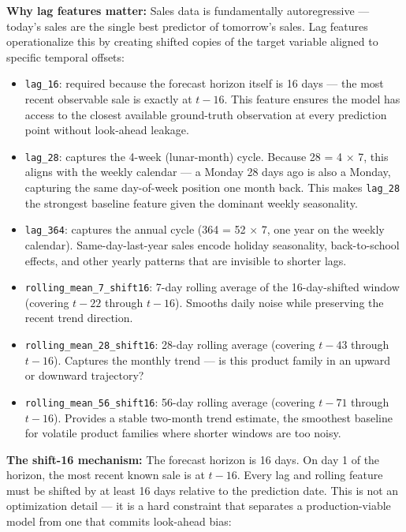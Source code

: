 \textbf{Why lag features matter:} Sales data is fundamentally autoregressive — today's sales are the single best predictor of tomorrow's sales. Lag features operationalize this by creating shifted copies of the target variable aligned to specific temporal offsets:
\begin{itemize}
  \item \texttt{lag\_16}: required because the forecast horizon itself is 16 days — the most recent observable sale is exactly at $t-16$. This feature ensures the model has access to the closest available ground-truth observation at every prediction point without look-ahead leakage.
  \item \texttt{lag\_28}: captures the 4-week (lunar-month) cycle. Because 28 = 4 $\times$ 7, this aligns with the weekly calendar — a Monday 28 days ago is also a Monday, capturing the same day-of-week position one month back. This makes \texttt{lag\_28} the strongest baseline feature given the dominant weekly seasonality.
  \item \texttt{lag\_364}: captures the annual cycle (364 = 52 $\times$ 7, one year on the weekly calendar). Same-day-last-year sales encode holiday seasonality, back-to-school effects, and other yearly patterns that are invisible to shorter lags.
  \item \texttt{rolling\_mean\_7\_shift16}: 7-day rolling average of the 16-day-shifted window (covering $t-22$ through $t-16$). Smooths daily noise while preserving the recent trend direction.
  \item \texttt{rolling\_mean\_28\_shift16}: 28-day rolling average (covering $t-43$ through $t-16$). Captures the monthly trend — is this product family in an upward or downward trajectory?
  \item \texttt{rolling\_mean\_56\_shift16}: 56-day rolling average (covering $t-71$ through $t-16$). Provides a stable two-month trend estimate, the smoothest baseline for volatile product families where shorter windows are too noisy.
\end{itemize}

\textbf{The shift-16 mechanism:} The forecast horizon is 16 days. On day 1 of the horizon, the most recent known sale is at $t-16$. Every lag and rolling feature must be shifted by at least 16 days relative to the prediction date. This is not an optimization detail — it is a hard constraint that separates a production-viable model from one that commits look-ahead bias:

